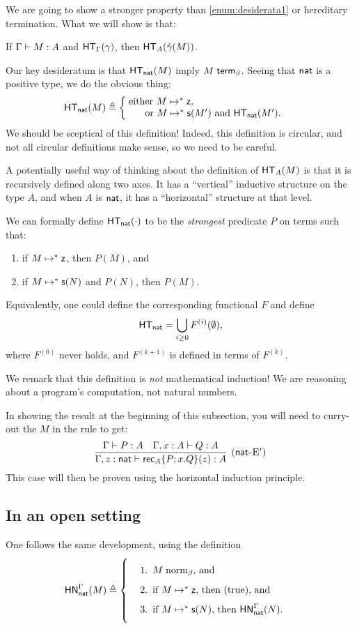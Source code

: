 \documentclass{article}
\begin{document}
We are going to show a stronger property than \cref{enum:desiderata1} or hereditary termination.
What we will show is that:
\begin{center}
  If $\Gamma \vdash M : A$ and $\mathsf{HT}_{\Gamma}(\gamma)$, then $\mathsf{HT}_{A}(\hat\gamma(M))$.
\end{center}

Our key desideratum is that $\mathsf{HT}_{\mathsf{nat}}(M)$ imply ${M} \; \mathsf{term}_{\beta}$.
Seeing that $\mathsf{nat}$ is a positive type, we do the obvious thing:
\[
  \hterm{\nat}{M} \triangleq \left\{\;\parbox{0.5\linewidth}{%
      either $\steps{M}{\natz}$,\\%
      \phantom{eith}or $\steps{M}{\nats{M'}}$ and $\hterm{\nat}{M'}$.%
    }\right.
\]
We should be sceptical of this definition!
Indeed, this definition is circular, and not all circular definitions make sense, so we need to be careful.

A potentially useful way of thinking about the definition of $\mathsf{HT}_{A}(M)$ is that it is recursively defined along two axes.
It has a ``vertical'' inductive structure on the type $A$, and when $A$ is $\mathsf{nat}$, it has a ``horizontal'' structure at that level.

We can formally define $\mathsf{HT}_{\mathsf{nat}}(\cdot)$ to be the \textit{strongest} predicate $P$ on terms such that:
\begin{enumerate}
\item if $M \mapsto^* \mathsf{z}$, then $P(M)$, and
\item if $M \mapsto^* \mathsf{s}(N)$ and $P(N)$, then $P(M)$.
\end{enumerate}
Equivalently, one could define the corresponding functional $F$ and define
\[ \mathsf{HT}_{\mathsf{nat}} = \bigcup_{i \geq 0} F^{(i)}(\emptyset), \]
where $F^{(0)}$ never holds, and $F^{(k+1)}$ is defined in terms of $F^{(k)}$.

We remark that this definition is \textit{not} mathematical induction!
We are reasoning about a program's computation, not natural numbers.

In showing the result at the beginning of this subsection, you will need to curry-out the $M$ in the rule  to get:
\[
  \infer[\rn{$\nat$-E$^\prime$}]{
    \hasEF{\Gamma,z:\nat}{\natrec{A}{P}{x}{Q}{z}}{A}
  }{
    \hasEF{\Gamma}{P}{A}
    &
    \hasEF{\Gamma,x:A}{Q}{A}
  }
\]
This case will then be proven using the horizontal induction principle.

\subsection{In an open setting}

One follows the same development, using the definition
\[
  \hnorm{\Gamma}{\nat}{M} \triangleq \left\{\parbox{0.5\linewidth}{\begin{enumerate}
      \item $\bnorm{M}$, and
      \item if $\steps{M}{\natz}$, then (true), and
      \item if $\steps{M}{\nats{N}}$, then $\hnorm{\Gamma}{\nat}{N}$.
      \end{enumerate}}\right.
\]



\end{document}

